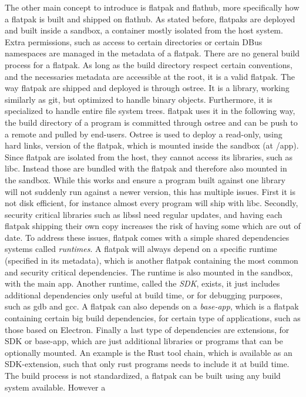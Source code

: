\documentclass[a4paper,11pt,oneside]{report}
\theoremstyle{definition}
\newcommand{\fp}{flatpak\xspace}
\newcommand{\fh}{flathub\xspace}
\begin{document}
The other main concept to introduce is \fp and \fh, more specifically how a
\fp is built and shipped on \fh. As stated before, flatpaks are deployed and built
inside a sandbox, a container mostly isolated from the host system. Extra
permissions, such as access to certain directories or certain DBus namespaces
are managed in the metadata of a \fp. There are no general build process for a
\fp. As long as the build directory respect certain conventions, and the
necessaries metadata are accessible at the root, it is a valid \fp. The way
\fp are shipped and deployed is through ostree. It is a library, working
similarly as git, but optimized to handle binary objects. Furthermore, it is
specialized to handle entire file system trees. \fp uses it in the following
way, the build directory of a program is committed through ostree and can be
push to a remote and pulled by end-users. Ostree is used to deploy a read-only,
using hard links, version of the \fp, which is mounted inside the sandbox (at
/app). Since \fp are isolated from the host, they cannot access its libraries,
such as libc. Instead those are bundled with the \fp and therefore also mounted
in the sandbox. While this works and ensure a program built against one library
will not suddenly run against a newer version, this has multiple issues. First
it is not disk efficient, for instance almost every program will ship with
libc. Secondly, security critical libraries such as libssl need regular
updates, and having each \fp shipping their own copy increases the risk of
having some which are out of date. To address these issues, \fp comes with a
simple shared dependencies systems called \emph{runtimes}. A \fp will always depend on
a specific runtime (specified in its metadata), which is another \fp
containing the most common and security critical dependencies. The runtime is
also mounted in the sandbox, with the main app. Another runtime, called the
\emph{SDK}, exists, it just includes additional dependencies only useful at build
time, or for debugging purposes, such as gdb and gcc. A \fp can also depends on
a \emph{base-app}, which is a \fp containing certain big build dependencies, for
certain type of applications, such as those based on Electron. Finally a last
type of dependencies are extensions, for SDK or base-app, which are just
additional libraries or programs that can be optionally mounted. An example is
the Rust tool chain, which is available as an SDK-extension, such that only rust
programs needs to include it at build time. The build process is not
standardized, a \fp can be built using any build system available. However a
\end{document}
